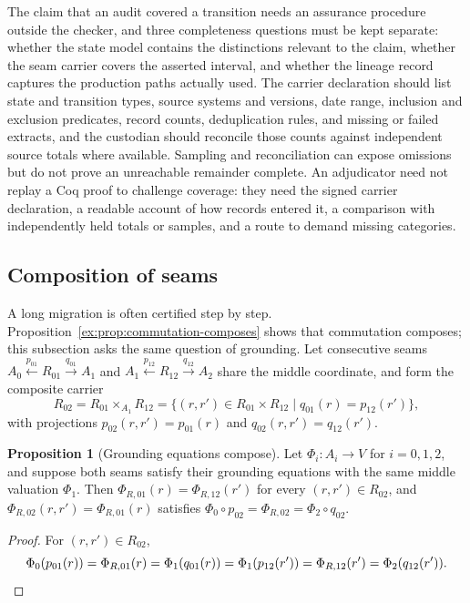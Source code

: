 \documentclass[11pt]{article}
\theoremstyle{definition}
\newtheorem{proposition}{Proposition}[section]
\begin{document}
The claim that an audit covered a transition needs an assurance procedure outside the checker, and three completeness questions must be kept separate: whether the state model contains the distinctions relevant to the claim, whether the seam carrier covers the asserted interval, and whether the lineage record captures the production paths actually used. The carrier declaration should list state and transition types, source systems and versions, date range, inclusion and exclusion predicates, record counts, deduplication rules, and missing or failed extracts, and the custodian should reconcile those counts against independent source totals where available. Sampling and reconciliation can expose omissions but do not prove an unreachable remainder complete. An adjudicator need not replay a Coq proof to challenge coverage: they need the signed carrier declaration, a readable account of how records entered it, a comparison with independently held totals or samples, and a route to demand missing categories.

\subsection{Composition of seams}\label{ex:sec:lineage-composition}

A long migration is often certified step by step. Proposition~\ref{ex:prop:commutation-composes} shows that commutation composes; this subsection asks the same question of grounding. Let consecutive seams $A_0\xleftarrow{p_{01}}R_{01}\xrightarrow{q_{01}}A_1$ and $A_1\xleftarrow{p_{12}}R_{12}\xrightarrow{q_{12}}A_2$ share the middle coordinate, and form the composite carrier
\[
R_{02}=R_{01}\times_{A_1}R_{12}=\{(r,r')\in R_{01}\times R_{12}\mid q_{01}(r)=p_{12}(r')\},
\]
with projections $p_{02}(r,r')=p_{01}(r)$ and $q_{02}(r,r')=q_{12}(r')$.

\begin{proposition}[Grounding equations compose]\label{ex:prop:equations-compose}
Let $\Phi_i:A_i\to V$ for $i=0,1,2$, and suppose both seams satisfy their grounding equations with the same middle valuation $\Phi_1$. Then $\Phi_{R,01}(r)=\Phi_{R,12}(r')$ for every $(r,r')\in R_{02}$, and $\Phi_{R,02}(r,r')=\Phi_{R,01}(r)$ satisfies $\Phi_0\circ p_{02}=\Phi_{R,02}=\Phi_2\circ q_{02}$.
\end{proposition}
\begin{proof}
For $(r,r')\in R_{02}$,
\[
\Phi_0(p_{01}(r))=\Phi_{R,01}(r)=\Phi_1(q_{01}(r))=\Phi_1(p_{12}(r'))=\Phi_{R,12}(r')=\Phi_2(q_{12}(r')).\qedhere
\]
\end{proof}
\end{document}
